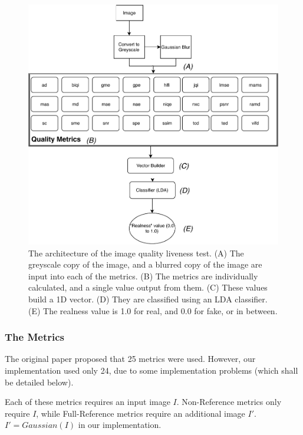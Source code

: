 \documentclass[11pt,a4paper]{article}
\begin{document}
            \begin{figure}
                \centering
                \includegraphics[width=\linewidth]{ImageQualityLivenessTest.pdf}
                \caption{The architecture of the image quality liveness test. (A) The greyscale copy of the image, and a blurred copy of the image are input into each of the metrics.
                (B) The metrics are individually calculated, and a single value output from them. (C) These values build a 1D vector. (D) They are classified using an LDA classifier. (E) The realness value
                is 1.0 for real, and 0.0 for fake, or in between.}
                \label{ImageQualityLivenessTestDiagram}
            \end{figure}
    
            \subsubsection{The Metrics}
            The original paper proposed that 25 metrics were used. However, our implementation used only 24, due to some implementation problems (which shall be detailed below).
           
            Each of these metrics requires an input image $I$. Non-Reference metrics only require $I$, while Full-Reference metrics require an additional image $I'$. $I' = Gaussian(I)$ in our implementation.
\end{document}
